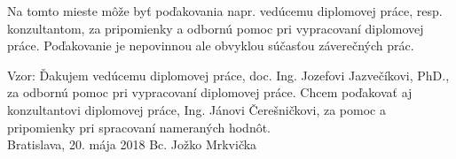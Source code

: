 \null
\vfill
\noindent
Na tomto mieste môže byť poďakovania napr. vedúcemu diplomovej práce, resp. konzultantom, za pripomienky a odbornú pomoc pri vypracovaní diplomovej práce. Poďakovanie je nepovinnou ale obvyklou súčasťou záverečných prác.

Vzor: Ďakujem vedúcemu diplomovej práce, doc. Ing. Jozefovi Jazvečíkovi, PhD., za odbornú pomoc pri vypracovaní diplomovej práce. Chcem poďakovať aj konzultantovi diplomovej práce, Ing. Jánovi Čerešničkovi, za pomoc a pripomienky pri spracovaní nameraných hodnôt.\\

\noindent Bratislava, 20. mája 2018 \hfill Bc. Jožko Mrkvička
\cleardoublepage


	

